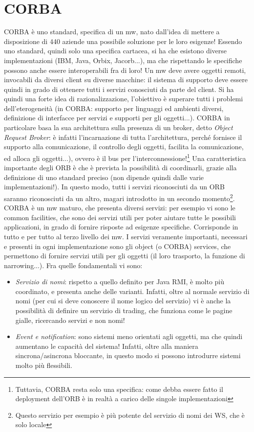 \section{CORBA}
CORBA è uno standard, specifica di un mw, nato dall'idea di mettere a disposizione di 440 aziende una possibile 
soluzione per le loro esigenze!
Essendo uno standard, quindi solo una specifica cartacea, si ha che esistono diverse implementazioni (IBM, Java, Orbix, 
Jacorb...), ma che rispettando le specifiche possono anche essere interoperabili fra di loro!
Un mw deve avere oggetti remoti, invocabili da diversi client su diverse macchine: il sistema di supporto deve essere
quindi in grado di ottenere tutti i servizi conosciuti da parte del client. Si ha quindi una forte idea di 
razionalizzazione, l'obiettivo è superare tutti i problemi dell'eterogeneità (in CORBA: supporto per linguaggi ed 
ambienti diversi, definizione di interfacce per servizi e supporti per gli oggetti...).
CORBA in particolare basa la sua architettura sulla presenza di un broker, detto \textit{Object Request Broker}: è 
infatti l'incarnazione di tutta l'architettura, perché fornisce il supporto alla comunicazione, il controllo degli 
oggetti, facilita la comunicazione, ed alloca gli oggetti...), ovvero è il bus per 
l'interconnessione!\footnote{Tuttavia, CORBA resta solo una specifica: come debba essere fatto il deployment
dell'ORB è in realtà a carico delle singole implementazioni} Una caratteristica importante degli ORB è che è prevista la 
possibilità di coordinarli, grazie alla definizione di uno standard preciso (non dipende quindi dalle varie 
implementazioni!). In questo modo, tutti i servizi riconosciuti da un ORB saranno riconosciuti da un altro, magari 
introdotto in un secondo momento\footnote{Questo servizio per esempio è più potente del servizio di nomi dei WS, che è 
solo locale}.
CORBA è un mw maturo, che presenta diversi servizi: per esempio vi sono le common facilities, che sono dei servizi utili 
per poter aiutare tutte le possibili applicazioni, in grado di fornire risposte ad esigenze specifiche. Corrisponde in
tutto e per tutto al terzo livello dei mw.
I servizi veramente importanti, necessari e presenti in ogni implementazione sono gli object (o CORBA) services, che 
permettono di fornire servizi utili per gli oggetti (il loro trasporto, la funzione di narrowing...). 
Fra quelle fondamentali vi sono:
\begin{itemize}
 \item \textit{Servizio di nomi}: rispetto a quello definito per Java RMI, è molto più coordinato, e presenta anche 
 delle varianti. Infatti, oltre al normale servizio di nomi (per cui si deve conoscere il nome logico del servizio) vi 
 è  anche la possibilità di definire un servizio di trading, che funziona come le pagine gialle, ricercando servizi e 
 non nomi!
 \item \textit{Event e notification}: sono sistemi meno orientati agli oggetti, ma che quindi aumentano le capacità del 
 sistema! Infatti, oltre alla maniera sincrona/asincrona bloccante, in questo modo si possono introdurre sistemi
 molto più flessibili.
\end{itemize}
